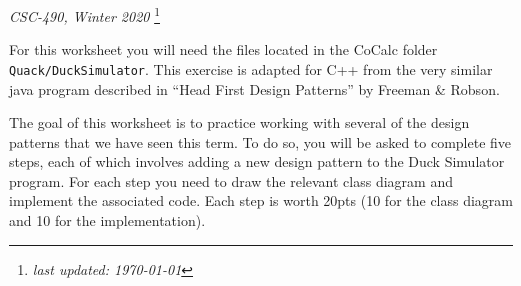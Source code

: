 \documentclass[11pt]{article}
\newlength{\up}\setlength{\up}{-\baselineskip}
\newcommand\blfootnote[1]{%
  \begingroup
  \renewcommand\thefootnote{}\footnote{#1}%
  \addtocounter{footnote}{-1}%
  \endgroup
}
\begin{document}
\hfill
\emph{CSC-490, Winter 2020}
\blfootnote{\emph{last updated: \today}}



\medskip

For this worksheet you will need the files located in the CoCalc folder \texttt{Quack/DuckSimulator}. This exercise is adapted for C++ from the very similar java program described in ``Head First Design Patterns'' by Freeman \& Robson.

The goal of this worksheet is to practice working with several of the design patterns that we have seen this term. To do so, you will be asked to complete five steps, each of which involves adding a new design pattern to the Duck Simulator program. For each step you need to draw the relevant class diagram and implement the associated code. Each step is worth 20pts (10 for the class diagram and 10 for the implementation). 
\end{document}

